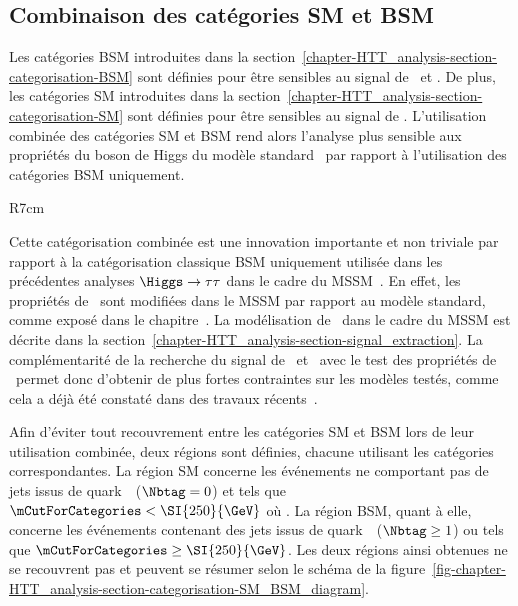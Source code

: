 \subsection{Combinaison des catégories SM et BSM}\label{chapter-HTT_analysis-section-categorisation-SM_and_BSM}
Les catégories BSM introduites dans la section~\ref{chapter-HTT_analysis-section-categorisation-BSM} sont définies pour être sensibles au signal de \Higgs\ et \HiggsA.
De plus, les catégories SM introduites dans la section~\ref{chapter-HTT_analysis-section-categorisation-SM} sont définies pour être sensibles au signal de \higgs.
L'utilisation combinée des catégories SM et BSM rend alors l'analyse plus sensible aux propriétés du boson de Higgs du modèle standard \higgs\ par rapport à l'utilisation des catégories BSM uniquement.
\begin{wrapfigure}{R}{7cm}
\centering

\caption{Définition des deux régions utilisant des catégories différentes.}
\label{fig-chapter-HTT_analysis-section-categorisation-SM_BSM_diagram}
\end{wrapfigure}
\par
Cette catégorisation combinée est une innovation importante et non triviale par rapport à la catégorisation classique \og BSM uniquement \fg{} utilisée dans les précédentes analyses $\Higgs\to\tau\tau$ dans le cadre du MSSM~\cite{CMS-PAS-HIG-13-021,CMS-PAS-HIG-14-029,CMS-PAS-HIG-17-020}.
En effet, les propriétés de \higgs\ sont modifiées dans le MSSM par rapport au modèle standard, comme exposé dans le chapitre~.
La modélisation de \higgs\ dans le cadre du MSSM est décrite dans la section~\ref{chapter-HTT_analysis-section-signal_extraction}.
La complémentarité de la recherche du signal de \Higgs\ et \HiggsA\ avec le test des propriétés de \higgs\ permet donc d'obtenir de plus fortes contraintes sur les modèles testés, comme cela a déjà été constaté dans des travaux récents~\cite{Artur_thesis}.
\par
Afin d'éviter tout recouvrement entre les catégories SM et BSM lors de leur utilisation combinée, deux régions sont définies, chacune utilisant les catégories correspondantes.
La région SM concerne les événements ne comportant pas de jets issus de quark~\quarkb\ ($\Nbtag=0$) et tels que $\mCutForCategories < \SI{250}{\GeV}$ où
\mCutForCategoriesdef.
La région BSM, quant à elle, concerne les événements contenant des jets issus de quark~\quarkb\ ($\Nbtag\geq1$) ou tels que $\mCutForCategories \geq \SI{250}{\GeV}$.
Les deux régions ainsi obtenues ne se recouvrent pas et peuvent se résumer selon le schéma de la figure~\ref{fig-chapter-HTT_analysis-section-categorisation-SM_BSM_diagram}.